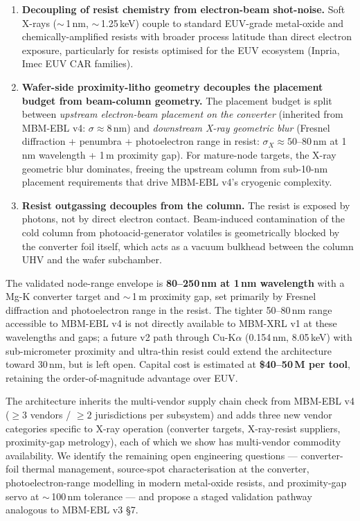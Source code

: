 \documentclass[11pt,letterpaper]{article}
\begin{document}
\begin{enumerate}[leftmargin=1.6em]
  \item \textbf{Decoupling of resist chemistry from electron-beam shot-noise.} Soft X-rays ($\sim$\,1\,nm, $\sim$\,1.25\,keV) couple to standard EUV-grade metal-oxide and chemically-amplified resists with broader process latitude than direct electron exposure, particularly for resists optimised for the EUV ecosystem (Inpria, Imec EUV CAR families).
  \item \textbf{Wafer-side proximity-litho geometry decouples the placement budget from beam-column geometry.} The placement budget is split between \textit{upstream electron-beam placement on the converter} (inherited from MBM-EBL v4: $\sigma \approx 8$\,nm) and \textit{downstream X-ray geometric blur} (Fresnel diffraction + penumbra + photoelectron range in resist: $\sigma_X \approx 50$--$80$\,nm at 1\,nm wavelength + 1\,\textmu m proximity gap). For mature-node targets, the X-ray geometric blur dominates, freeing the upstream column from sub-10-nm placement requirements that drive MBM-EBL v4's cryogenic complexity.
  \item \textbf{Resist outgassing decouples from the column.} The resist is exposed by photons, not by direct electron contact. Beam-induced contamination of the cold column from photoacid-generator volatiles is geometrically blocked by the converter foil itself, which acts as a vacuum bulkhead between the column UHV and the wafer subchamber.
\end{enumerate}

The validated node-range envelope is \textbf{80--250\,nm at 1\,nm wavelength} with a Mg-K converter target and $\sim$\,1\,\textmu m proximity gap, set primarily by Fresnel diffraction and photoelectron range in the resist. The tighter 50--80\,nm range accessible to MBM-EBL v4 is not directly available to MBM-XRL v1 at these wavelengths and gaps; a future v2 path through Cu-K$\alpha$ (0.154\,nm, 8.05\,keV) with sub-micrometer proximity and ultra-thin resist could extend the architecture toward 30\,nm, but is left open. Capital cost is estimated at \textbf{\$40--50\,M per tool}, retaining the order-of-magnitude advantage over EUV.

The architecture inherits the multi-vendor supply chain check from MBM-EBL v4 ($\geq 3$ vendors / $\geq 2$ jurisdictions per subsystem) and adds three new vendor categories specific to X-ray operation (converter targets, X-ray-resist suppliers, proximity-gap metrology), each of which we show has multi-vendor commodity availability. We identify the remaining open engineering questions --- converter-foil thermal management, source-spot characterisation at the converter, photoelectron-range modelling in modern metal-oxide resists, and proximity-gap servo at $\sim$\,100\,nm tolerance --- and propose a staged validation pathway analogous to MBM-EBL v3 \S 7.
\end{document}
